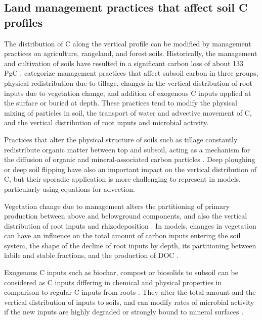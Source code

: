 \documentclass[11pt, oneside, a4paper]{article}   	%
\begin{document}
\subsection{Land management practices that affect soil C profiles}
The distribution of C along the vertical profile can be modified by management practices on agriculture, rangeland, and forest soils. 
Historically, the management and cultivation of soils have resulted in a significant carbon loss of about 133 PgC \citep{Sanderman2017}. \citet{HicksPries2023} categorize management practices that affect subsoil carbon in three groups, physical redistribution due to tillage, changes in the vertical distribution of root inputs due to vegetation change, and addition of exogenous C inputs applied at the surface or buried at depth. These practices tend to modify the physical mixing of particles in soil, the transport of water and advective movement of C, and the vertical distribution of root inputs and microbial activity.

Practices that alter the physical structure of soils such as tillage constantly redistribute organic matter between top and subsoil, acting as a mechanism for the diffusion of organic and mineral-associated carbon particles \citep{Keyvanshokouhi2019, Mary2020, Button2022}. Deep ploughing \citep{Alcantara2016, Wang2023JCP} or deep soil flipping \citep{Schiedung2019} have also an important impact on the vertical distribution of C, but their sporadic application is more challenging to represent in models, particularly using equations for advection. 

Vegetation change due to management alters the partitioning of primary production between above and belowground components, and also the vertical distribution of root inputs and rhizodeposition \citep{Rumpel2011}. In models, changes in vegetation can have an influence on the total amount of carbon inputs entering the soil system, the shape of the decline of root inputs by depth, its partitioning between labile and stable fractions, and the production of DOC \citep{Ota2013}. 

Exogenous C inputs such as biochar, compost or biosolids to subsoil can be considered as C inputs differing in chemical and physical properties in comparison to regular C inputs from roots \citep{Paustian2016}. They alter the total amount and the vertical distribution of inputs to soils, and can modify rates of microbial activity if the new inputs are highly degraded or strongly bound to mineral surfaces \citep{Rumpel2012, Button2022}. 
\end{document}
